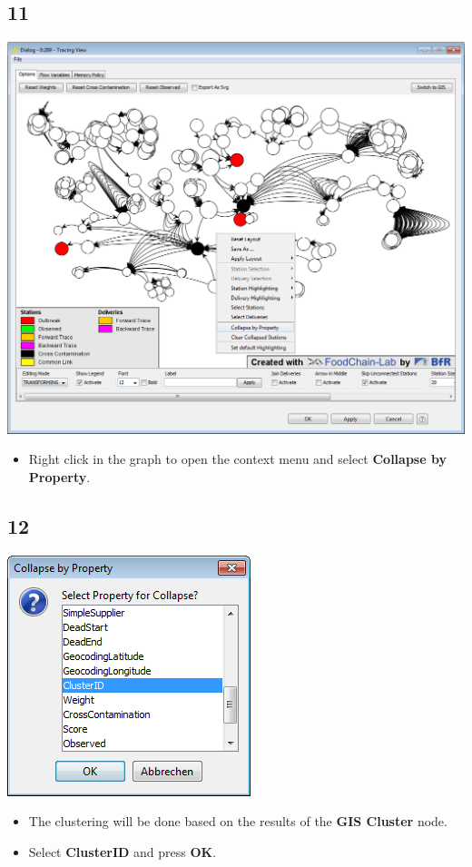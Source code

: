 \documentclass{beamer}
\begin{document}
\subsection{11}
\begin{frame}
	\begin{center}
  		\includegraphics[height=0.6\textheight]{11.png}
	\end{center}
	\begin{itemize}
		\item Right click in the graph to open the context menu and select \textbf{Collapse by Property}.
	\end{itemize}
\end{frame}

\subsection{12}
\begin{frame}
	\begin{center}
  		\includegraphics[height=0.5\textheight]{12.png}
	\end{center}
	\begin{itemize}
		\item The clustering will be done based on the results of the \textbf{GIS Cluster} node.
		\item Select \textbf{ClusterID} and press \textbf{OK}.
	\end{itemize}
\end{frame}
\end{document}
